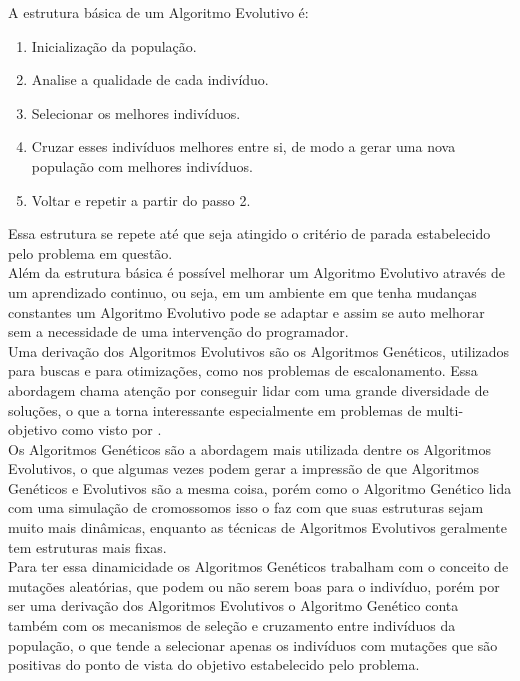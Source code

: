 \noindent A estrutura básica de um Algoritmo Evolutivo é:
\begin{enumerate}
    \item Inicialização da população.
    \item Analise a qualidade de cada indivíduo.
    \item Selecionar os melhores indivíduos.
    \item Cruzar esses indivíduos melhores entre si, de modo a gerar uma nova população com melhores indivíduos.
    \item Voltar e repetir a partir do passo 2.
\end{enumerate}
Essa estrutura se repete até que seja atingido o critério de parada estabelecido pelo problema em questão.\\
\indent Além da estrutura básica é possível melhorar um Algoritmo Evolutivo através de um aprendizado continuo, ou seja, em um ambiente em que tenha mudanças constantes um Algoritmo Evolutivo pode se adaptar e assim se auto melhorar sem a necessidade de uma intervenção do programador.\\
\indent Uma derivação dos Algoritmos Evolutivos são os Algoritmos Genéticos, utilizados para buscas e para otimizações, como nos problemas de escalonamento.
%
Essa abordagem chama atenção por conseguir lidar com uma grande diversidade de soluções, o que a torna interessante especialmente em problemas de multi-objetivo como visto por \cite{Bagchi1999}.\\
\indent Os Algoritmos Genéticos são a abordagem mais utilizada dentre os Algoritmos Evolutivos, o que algumas vezes podem gerar a impressão de que Algoritmos Genéticos e Evolutivos são a mesma coisa, porém como o Algoritmo Genético lida com uma simulação de cromossomos isso o faz com que suas estruturas sejam muito mais dinâmicas, enquanto as técnicas de Algoritmos Evolutivos geralmente tem estruturas mais fixas.\\
%
\indent Para ter essa dinamicidade os Algoritmos Genéticos trabalham com o conceito de mutações aleatórias, que podem ou não serem boas para o indivíduo, porém por ser uma derivação dos Algoritmos Evolutivos o Algoritmo Genético conta também com os mecanismos de seleção e cruzamento entre indivíduos da população, o que tende a selecionar apenas os indivíduos com mutações que são positivas do ponto de vista do objetivo estabelecido pelo problema.\\
